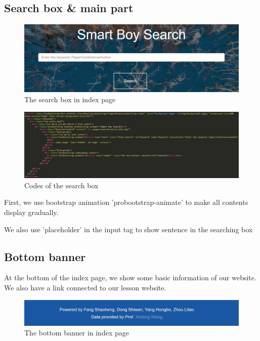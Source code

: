 \documentclass{book}
\begin{document}
\subsection {Search box \& main part}

\begin{figure}[H]
\centering
\includegraphics[scale=0.45]{img/fsh_index_sb.jpg}
\caption{The search box in index page}
\end{figure}

\begin{figure}[H]
\centering
\includegraphics[scale=0.45]{img/fsh_index_code_2.jpg}
\caption{Codes of the search box}
\end{figure}


First, we use bootstrap animation 'probootstrap-animate' to make all contents display gradually.
\par We also use 'placeholder' in the input tag to show sentence in the searching box

\subsection {Bottom banner}

At the bottom of the index page, we show some basic information of our website. We also have a link connected to our lesson website.

\begin{figure}[H]
\centering
\includegraphics[scale=0.45]{img/fsh_index_bottom.jpg}
\caption{The bottom banner in index page}
\end{figure}
\end{document}
